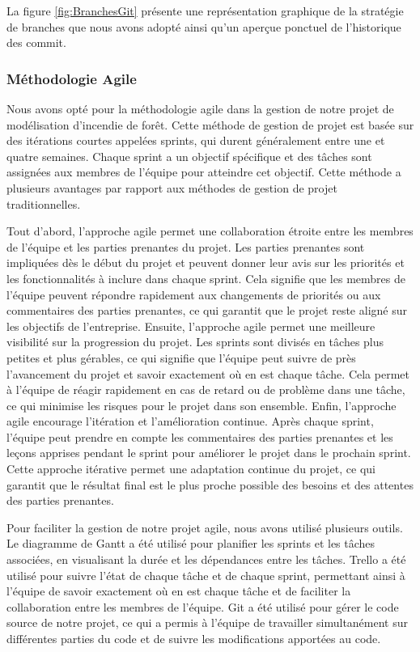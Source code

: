 La figure \ref{fig:BranchesGit} présente une représentation graphique de la stratégie de branches que nous avons adopté ainsi qu'un aperçue ponctuel de l’historique des commit.


\subsubsection{Méthodologie Agile}

Nous avons opté pour la méthodologie agile dans la gestion de notre projet de modélisation d'incendie de forêt. Cette méthode de gestion de projet est basée sur des itérations courtes appelées sprints, qui durent généralement entre une et quatre semaines. Chaque sprint a un objectif spécifique et des tâches sont assignées aux membres de l'équipe pour atteindre cet objectif. Cette méthode a plusieurs avantages par rapport aux méthodes de gestion de projet traditionnelles.

Tout d'abord, l'approche agile permet une collaboration étroite entre les membres de l'équipe et les parties prenantes du projet. Les parties prenantes sont impliquées dès le début du projet et peuvent donner leur avis sur les priorités et les fonctionnalités à inclure dans chaque sprint. Cela signifie que les membres de l'équipe peuvent répondre rapidement aux changements de priorités ou aux commentaires des parties prenantes, ce qui garantit que le projet reste aligné sur les objectifs de l'entreprise. Ensuite, l'approche agile permet une meilleure visibilité sur la progression du projet. Les sprints sont divisés en tâches plus petites et plus gérables, ce qui signifie que l'équipe peut suivre de près l'avancement du projet et savoir exactement où en est chaque tâche. Cela permet à l'équipe de réagir rapidement en cas de retard ou de problème dans une tâche, ce qui minimise les risques pour le projet dans son ensemble. Enfin, l'approche agile encourage l'itération et l'amélioration continue. Après chaque sprint, l'équipe peut prendre en compte les commentaires des parties prenantes et les leçons apprises pendant le sprint pour améliorer le projet dans le prochain sprint. Cette approche itérative permet une adaptation continue du projet, ce qui garantit que le résultat final est le plus proche possible des besoins et des attentes des parties prenantes.

Pour faciliter la gestion de notre projet agile, nous avons utilisé plusieurs outils. Le diagramme de Gantt a été utilisé pour planifier les sprints et les tâches associées, en visualisant la durée et les dépendances entre les tâches. Trello a été utilisé pour suivre l'état de chaque tâche et de chaque sprint, permettant ainsi à l'équipe de savoir exactement où en est chaque tâche et de faciliter la collaboration entre les membres de l'équipe. Git a été utilisé pour gérer le code source de notre projet, ce qui a permis à l'équipe de travailler simultanément sur différentes parties du code et de suivre les modifications apportées au code.


